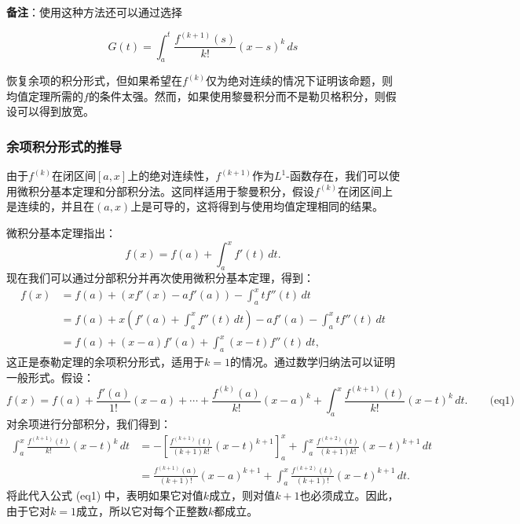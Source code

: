 \textbf{备注}：使用这种方法还可以通过选择

\[
G(t) = \int_a^t \frac{f^{(k+1)}(s)}{k!} (x - s)^k \, ds~
\]

恢复余项的积分形式，但如果希望在\( f^{(k)} \)仅为绝对连续的情况下证明该命题，则均值定理所需的\( f \)的条件太强。然而，如果使用黎曼积分而不是勒贝格积分，则假设可以得到放宽。
\subsubsection{余项积分形式的推导}  
由于\( f^{(k)} \)在闭区间\( [a, x] \)上的绝对连续性，\( f^{(k+1)} \)作为\( L^1 \)-函数存在，我们可以使用微积分基本定理和分部积分法。这同样适用于黎曼积分，假设\( f^{(k)} \)在闭区间上是连续的，并且在\( (a, x) \)上是可导的，这将得到与使用均值定理相同的结果。

微积分基本定理指出：
\[
f(x) = f(a) + \int_a^x f'(t) \, dt.~
\]
现在我们可以通过分部积分并再次使用微积分基本定理，得到：
\[
\begin{aligned}
f(x) &= f(a) + \left( x f'(x) - a f'(a) \right) - \int_a^x t f''(t) \, dt\\ 
&= f(a) + x \left( f'(a) + \int_a^x f''(t) \, dt \right) - a f'(a) - \int_a^x t f''(t) \, dt\\
&= f(a) + (x - a) f'(a) + \int_a^x (x - t) f''(t) \, dt,
\end{aligned}~
\]
这正是泰勒定理的余项积分形式，适用于\( k = 1 \)的情况。通过数学归纳法可以证明一般形式。假设：
\[
f(x) = f(a) + \frac{f'(a)}{1!} (x - a) + \cdots + \frac{f^{(k)}(a)}{k!} (x - a)^k + \int_a^x \frac{f^{(k+1)}(t)}{k!} (x - t)^k \, dt.\qquad \text{(eq1)}~
\]
对余项进行分部积分，我们得到：
\[
\begin{aligned}
\int_a^x \frac{f^{(k+1)}(t)}{k!} (x - t)^k \, dt &= -\left[ \frac{f^{(k+1)}(t)}{(k+1)k!} (x - t)^{k+1} \right]_a^x + \int_a^x \frac{f^{(k+2)}(t)}{(k+1)k!} (x - t)^{k+1} \, dt\\
&= \frac{f^{(k+1)}(a)}{(k+1)!} (x - a)^{k+1} + \int_a^x \frac{f^{(k+2)}(t)}{(k+1)!} (x - t)^{k+1} \, dt.
\end{aligned}~
\]
将此代入公式 (eq1) 中，表明如果它对值\( k \)成立，则对值\( k + 1 \)也必须成立。因此，由于它对\( k = 1 \)成立，所以它对每个正整数\( k \)都成立。
